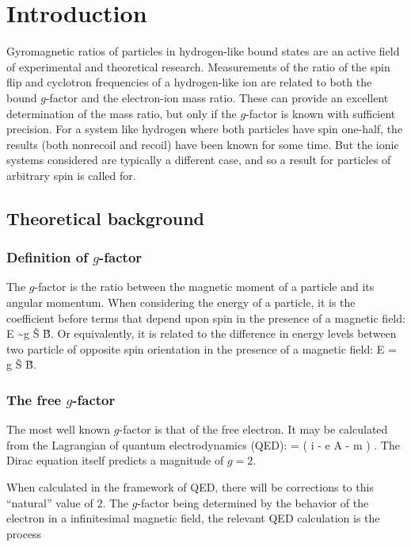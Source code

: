 \chapter{Introduction}

Gyromagnetic ratios of particles in hydrogen-like bound states are an active field of experimental and theoretical research.  Measurements of the ratio of the spin flip and cyclotron frequencies of a hydrogen-like ion are related to both the bound $g$-factor and the electron-ion mass ratio.  These can provide an excellent determination of the mass ratio, but only if the $g$-factor is known with sufficient precision.  For a system like hydrogen where both particles have spin one-half, the results (both nonrecoil and recoil) have been known for some time.  But the ionic systems considered are typically a different case, and so a result for particles of arbitrary spin is called for.


\section{Theoretical background}


\subsection{Definition of $g$-factor}
The $g$-factor is the ratio between the magnetic moment of a particle and its angular momentum.  When considering the energy of a particle, it is the coefficient before terms that depend upon spin in the presence of a magnetic field:
 \beq
 	E \sim  g  \v{S} \cdot \v{B}.
 \eeq
Or equivalently, it is related to the difference in energy levels between two particle of opposite spin orientation in the presence of a magnetic field:
\beq
	\Delta E =  g  \v{S} \cdot \v{B}.
\eeq


\subsection{The free $g$-factor}
The most well known $g$-factor is that of the free electron.  It may be calculated from the Lagrangian of quantum electrodynamics (QED):
\beq
	 = \Psibar \left( i \partial \cdot \gamma - e A \cdot \gamma - m \right ) \Psi.
\eeq
The Dirac equation itself predicts a magnitude of $g=2$.  

When calculated in the framework of QED, there will be corrections to this ``natural'' value of $2$.  The $g$-factor being determined by the behavior of the electron in a infinitesimal magnetic field, the relevant QED calculation is the process

